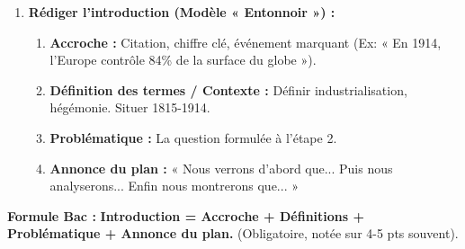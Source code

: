 \documentclass[11pt]{article}
\begin{document}
\begin{methode}
\begin{enumerate}
\begin{itemize}
        \item \textbf{III. Les limites et contradictions d'une puissance fragile :} A. Dépendance aux importations (blé, coton, pétrole, caoutchouc). B. Question sociale interne (grèves, internationalisme ouvrier vs nationalisme). C. Rivalités inter-impérialistes (course aux armements, alliances) $\rightarrow$ 1914.
    \end{itemize}
    \item \textbf{Rédiger l'introduction (Modèle « Entonnoir ») :}
    \begin{enumerate}
        \item \textbf{Accroche :} Citation, chiffre clé, événement marquant (Ex: « En 1914, l'Europe contrôle 84\% de la surface du globe »).
        \item \textbf{Définition des termes / Contexte :} Définir industrialisation, hégémonie. Situer 1815-1914.
        \item \textbf{Problématique :} La question formulée à l'étape 2.
        \item \textbf{Annonce du plan :} « Nous verrons d'abord que... Puis nous analyserons... Enfin nous montrerons que... »
    \end{enumerate}
\end{enumerate}
\textbf{Formule Bac :} \textbf{Introduction = Accroche + Définitions + Problématique + Annonce du plan.} (Obligatoire, notée sur 4-5 pts souvent).
\end{methode}
\end{document}
